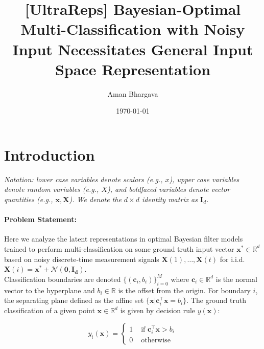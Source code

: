 \documentclass[12pt]{article}
\begin{document}
\title{[UltraReps] Bayesian-Optimal Multi-Classification with Noisy Input Necessitates General Input Space Representation}

\author{Aman Bhargava}

\date{\today}
\maketitle

\section{Introduction}
\label{sec:intro}
\textit{Notation: lower case variables denote scalars (e.g., $x$), upper case variables denote random variables (e.g., $X$), and boldfaced variables denote vector quantities (e.g., $\mathbf x, \mathbf X$). 
We denote the $d\times d$ identity matrix as $\mathbf I_d$.} \\

\paragraph{Problem Statement: } Here we analyze the latent representations in optimal Bayesian filter models trained to perform multi-classification on some ground truth input vector $\mathbf x^* \in \mathbb R^d$ based on noisy discrete-time measurement signals $\mathbf X(1), \dots, \mathbf X(t)$ for i.i.d. $\mathbf X(i) = \mathbf x^* + \mathcal N(\mathbf{0, I_d})$. \\

Classification boundaries are denoted $\{(\mathbf c_i, b_i)\}_{i = 0}^M$ where $\mathbf c_i \in \mathbb R^d$ is the normal vector to the hyperplane and $b_i\in \mathbb R$ is the offset from the origin. 
For boundary $i$, the separating plane defined as the affine set $\{\mathbf x | \mathbf c_i^\top \mathbf x = b_i\}$. 
The ground truth classification of a given point $\mathbf x \in \mathbb R^d$ is given by decision rule $y(\mathbf x)$: 

\begin{equation}
	\label{def:decision_rule}
	y_i(\mathbf x) = \begin{cases}
		1 & \text{ if } \mathbf c_i^\top \mathbf x > b_i \\ 
		0 & \text{ otherwise } 
	\end{cases}
\end{equation}
\end{document}
